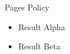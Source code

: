 \documentclass[14pt,t,overlay-policy=pages]{beamer-accessibility}
\begin{document}
\begin{frame}{Pages Policy}
\begin{itemize}
\item<1-> Result Alpha
\item<2-> Result Beta
\end{itemize}
\end{frame}
\end{document}
